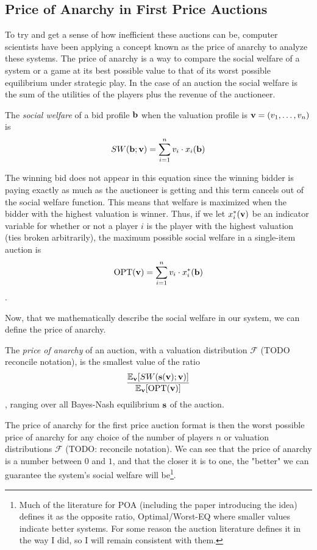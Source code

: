 \documentclass[12pt,twoside]{reedthesis}
\begin{document}
\subsection{Price of Anarchy in First Price Auctions}  
To try and get a sense of how inefficient these auctions can be, computer scientists have been applying a concept known as the price of anarchy to analyze these systems. The price of anarchy is a way to compare the social welfare of a system or a game at its best possible value to that of its worst possible equilibrium under strategic play. In the case of an auction the social welfare is the sum of the utilities of the players plus the revenue of the auctioneer.

\begin{dfn}
	The \textit{social welfare} of a bid profile $\textbf{b}$ when the valuation profile is $\textbf{v} = (v_1, \ldots, v_n)$ is 
	$$ SW(\textbf{b};\textbf{v}) = \sum_{i=1}^{n} v_i \cdot x_i (\textbf{b})$$
\end{dfn}

The winning bid does not appear in this equation since the winning bidder is paying exactly as much as the auctioneer is getting and this term cancels out of the social welfare function. This means that welfare is maximized when the bidder with the highest valuation is winner. Thus, if we let $x^*_i(\textbf{v})$ be an indicator variable for whether or not a player $i$ is the player with the highest valuation (ties broken arbitrarily), the maximum possible social welfare in a single-item auction is 
$$ \text{OPT}(\textbf{v}) = \sum_{i=1}^{n} v_i \cdot x^*_i (\textbf{b})$$.

Now, that we mathematically describe the social welfare in our system, we can define the price of anarchy. 

\begin{dfn}
	The \textit{price of anarchy} of an auction, with a valuation distribution $\mathcal{F}$ (TODO reconcile notation), is the smallest value of the ratio
	$$ \frac{\mathbb{E}_{\textbf{v}} [SW(\textbf{s}(\textbf{v});\textbf{v})]}{\mathbb{E}_{\textbf{v}}[\text{OPT}(\textbf{v})]}$$,
	ranging over all Bayes-Nash equilibrium $\textbf{s}$ of the auction.
\end{dfn}

The price of anarchy for the first price auction format is then the worst possible price of anarchy for any choice of the number of players $n$ or valuation distributions $\mathcal{F}$ (TODO: reconcile notation). We can see that the price of anarchy is a number between $0$ and $1$, and that the closer it is to one, the "better" we can guarantee the system's social welfare will be\footnote{Much of the literature for POA (including the paper introducing the idea) defines it as the opposite ratio, Optimal/Worst-EQ where smaller values indicate better systems. For some reason the auction literature defines it in the way I did, so I will remain consistent with them.}.
\end{document}
